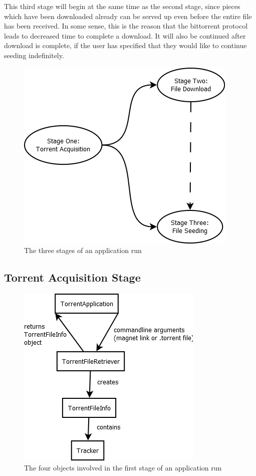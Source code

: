 \documentclass[letter]{scrartcl}
\begin{document}
This third stage will begin at the same time as the second stage, since pieces which have been downloaded already can be served up even before the entire file has been received.  In some sense, this is the reason that the bittorrent protocol leads to decreased time to complete a download.  It will also be continued after download is complete, if the user has specified that they would like to continue seeding indefinitely.

\begin{figure}[h]
\centering
\includegraphics[scale=.5]{stageDiagram.png}
\caption{The three stages of an application run}
\end{figure}

\subsection{Torrent Acquisition Stage}

\begin{figure}[h]
\centering
\includegraphics[scale=.5]{StepOne.png}
\caption{The four objects involved in the first stage of an application run}
\end{figure}
\end{document}
